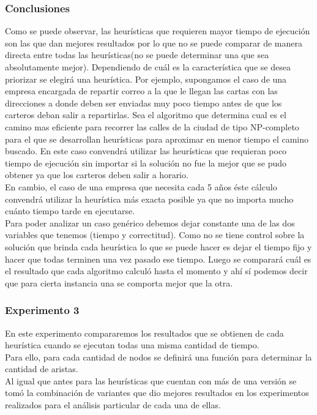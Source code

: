 \subsubsection*{Conclusiones}\;

Como se puede observar, las heurísticas que requieren mayor tiempo de ejecución son las que dan mejores resultados por lo que no se puede comparar de manera directa entre todas las heurísticas(no se puede determinar una que sea absolutamente mejor). Dependiendo de cuál es la característica que se desea priorizar se elegirá una heurística. Por ejemplo, supongamos el caso de una empresa encargada de repartir correo a la que le llegan las cartas con las direcciones a donde deben ser enviadas muy poco tiempo antes de que los carteros deban salir a repartirlas. Sea el algoritmo que determina cual es el camino mas eficiente para recorrer las calles de la ciudad de tipo NP-completo para el que se desarrollan heurísticas para aproximar en menor tiempo el camino buscado. En este caso convendrá utilizar las heurísticas que requieran poco tiempo de ejecución sin importar si la solución no fue la mejor que se pudo obtener ya que los carteros deben salir a horario. \\
En cambio, el caso de una empresa que necesita cada 5 años éste cálculo convendrá utilizar la heurística más exacta posible ya que no importa mucho cuánto tiempo tarde en ejecutarse.\\ 
Para poder analizar un caso genérico debemos dejar constante una de las dos variables que tenemos (tiempo y correctitud). Como no se tiene control sobre la solución que brinda cada heurística lo que se puede hacer es dejar el tiempo fijo y hacer que todas terminen una vez pasado ese tiempo. Luego se comparará cuál es el resultado que cada algoritmo calculó hasta el momento y ahí sí podemos decir que para cierta instancia una se comporta mejor que la otra.

\subsubsection*{Experimento 3}\;
En este experimento compararemos los resultados que se obtienen de cada heurística cuando se ejecutan todas una misma cantidad de tiempo.\\
Para ello, para cada cantidad de nodos se definirá una función para determinar la cantidad de aristas.\\
Al igual que antes para las heurísticas que cuentan con más de una versión se tomó la combinación de variantes que dio mejores resultados en los experimentos realizados para el análisis particular de cada una de ellas.\\


